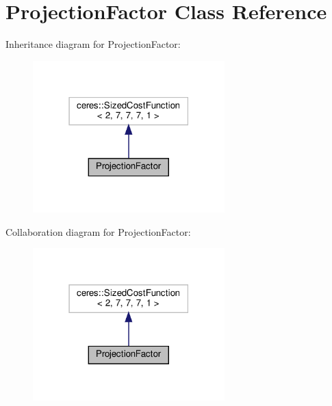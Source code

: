 \hypertarget{classProjectionFactor}{}\section{Projection\+Factor Class Reference}
\label{classProjectionFactor}


Inheritance diagram for Projection\+Factor\+:\nopagebreak
\begin{figure}[H]
\begin{center}
\leavevmode
\includegraphics[width=210pt]{classProjectionFactor__inherit__graph}
\end{center}
\end{figure}


Collaboration diagram for Projection\+Factor\+:\nopagebreak
\begin{figure}[H]
\begin{center}
\leavevmode
\includegraphics[width=210pt]{classProjectionFactor__coll__graph}
\end{center}
\end{figure}
